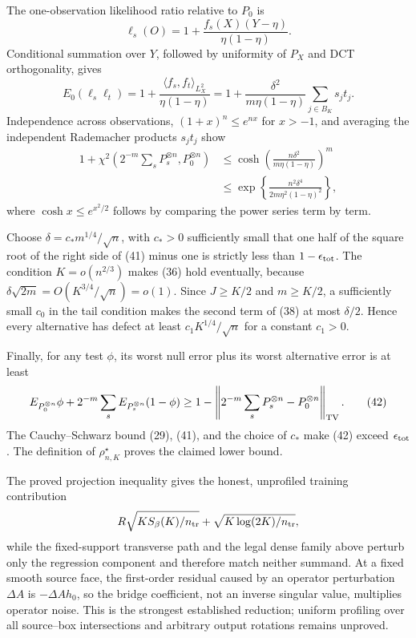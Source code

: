 The one-observation likelihood ratio relative to \(P_0\) is
\[
 \ell_s(O)=1+\frac{f_s(X)(Y-\eta)}{\eta(1-\eta)}. \tag{39}
\]
Conditional summation over \(Y\), followed by uniformity of \(P_X\) and DCT orthogonality, gives
\[
 E_0(\ell_s\ell_t)
 =1+\frac{\langle f_s,f_t\rangle_{L^2_X}}{\eta(1-\eta)}
 =1+\frac{\delta^2}{m\eta(1-\eta)}\sum_{j\in B_K}s_jt_j. \tag{40}
\]
Independence across observations, \((1+x)^n\le e^{nx}\) for \(x>-1\), and averaging the independent Rademacher products \(s_jt_j\) show
\[
 \begin{split}
 1+\chi^2\!\left(2^{-m}\sum_sP_s^{\otimes n},P_0^{\otimes n}\right)
 &\le \cosh\!\left(\frac{n\delta^2}{m\eta(1-\eta)}\right)^m\\
 &\le \exp\!\left\{\frac{n^2\delta^4}{2m\eta^2(1-\eta)^2}\right\},
 \end{split}\tag{41}
\]
where \(\cosh x\le e^{x^2/2}\) follows by comparing the power series term by term.

Choose \(\delta=c_*m^{1/4}/\sqrt n\), with \(c_*>0\) sufficiently small that one half of the square root of the right side of (41) minus one is strictly less than \(1-\epsilon_{\rm tot}\).  The condition \(K=o(n^{2/3})\) makes (36) hold eventually, because \(\delta\sqrt{2m}=O(K^{3/4}/\sqrt n)=o(1)\).  Since \(J\ge K/2\) and \(m\ge K/2\), a sufficiently small \(c_0\) in the tail condition makes the second term of (38) at most \(\delta/2\).  Hence every alternative has defect at least \(c_1K^{1/4}/\sqrt n\) for a constant \(c_1>0\).

Finally, for any test \(\phi\), its worst null error plus its worst alternative error is at least
\[
 E_{P_0^{\otimes n}}\phi+2^{-m}\sum_sE_{P_s^{\otimes n}}(1-\phi)
 \ge1-\left\|2^{-m}\sum_sP_s^{\otimes n}-P_0^{\otimes n}\right\|_{\rm TV}. \tag{42}
\]
The Cauchy--Schwarz bound (29), (41), and the choice of \(c_*\) make (42) exceed \(\epsilon_{\rm tot}\).  The definition of \(\rho^\star_{n,K}\) proves the claimed lower bound.

The proved projection inequality gives the honest, unprofiled training contribution
\[
 R\sqrt{KS_\beta(K)/n_{\rm tr}}+
 \sqrt{K\log(2K)/n_{\rm tr}},
\]
while the fixed-support transverse path and the legal dense family above perturb only the regression component and therefore match neither summand.  At a fixed smooth source face, the first-order residual caused by an operator perturbation \(\Delta A\) is \(-\Delta A h_0\), so the bridge coefficient, not an inverse singular value, multiplies operator noise.  This is the strongest established reduction; uniform profiling over all source--box intersections and arbitrary output rotations remains unproved.

